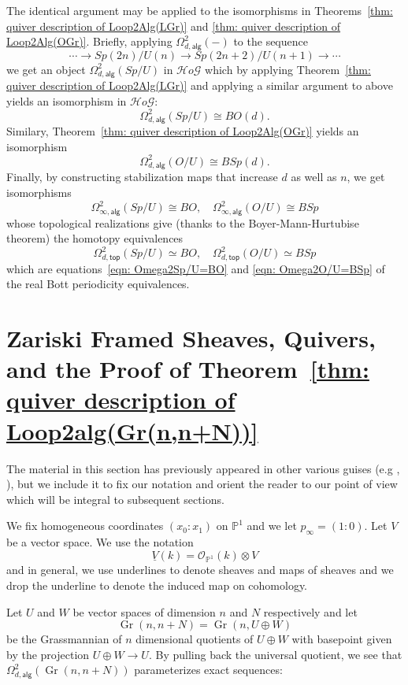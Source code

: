 \documentclass{amsart}
\theoremstyle{definition}
\newcommand{\HoG}{\mathcal{H}o\mathcal{G}}    %
\newcommand{\PP}{\mathbb{P}}
\newcommand{\OO}{\mathcal{O}}
\newcommand{\UL}[1]{\underline{#1}}
\newcommand{\alg}{\mathsf{alg}}
\renewcommand{\top}{\mathsf{top}}
\newcommand{\Gr}{\operatorname{Gr}}
\newcommand{\LoopTwo}{\Omega^{2}_{d,\alg}}
\newcommand{\LoopTwoTop}{\Omega^{2}_{d,\top}}
\newcommand{\homotopyeq}{\simeq}
\begin{document}
The identical argument may be applied to the isomorphisms in
Theorems~\ref{thm: quiver description of Loop2Alg(LGr)} and \ref{thm:
quiver description of Loop2Alg(OGr)}. Briefly, applying $\LoopTwo (-)$
to the sequence
\[
\dotsb \to Sp(2n)/U(n) \to Sp(2n+2)/U(n+1) \to \dotsb 
\]
we get an object $\LoopTwo (Sp/U)$ in $\HoG$ which by applying
Theorem~\ref{thm: quiver description of Loop2Alg(LGr)} and applying a
similar argument to above yields an isomorphism in $\HoG$:
\[
\LoopTwo (Sp/U) \cong BO(d) . 
\]
Similary, Theorem~\ref{thm: quiver description of Loop2Alg(OGr)}
yields an isomorphism
\[
\LoopTwo (O/U) \cong BSp(d) . 
\]
Finally, by constructing stabilization maps that increase $d$ as well
as $n$, we get isomorphisms
\[
\Omega^{2}_{\infty ,\alg } (Sp/U) \cong BO, \quad \Omega^{2}_{\infty ,\alg } (O/U) \cong BSp 
\]
whose topological realizations give (thanks to the
Boyer-Mann-Hurtubise theorem) the homotopy equivalences
\[
\LoopTwoTop (Sp/U)\homotopyeq BO, \quad \LoopTwoTop (O/U)\homotopyeq
BSp
\]
which are equations~\eqref{eqn: Omega2Sp/U=BO} and \eqref{eqn:
Omega2O/U=BSp} of the real Bott periodicity equivalences.


\section{Zariski Framed Sheaves, Quivers, and the Proof of
Theorem~\ref{thm: quiver description of
Loop2alg(Gr(n,n+N))}}\label{sec: Zariski framed sheaves, quivers, and
proof of Loop2(Gr) theorem}


The material in this section has previously appeared in other various
guises (e.g \cite[\S~5]{Larson-Vakil-BottPeriodicity}, \cite[\S~3]{Nakajima-Handsaw}),
but we include it to fix our notation and orient the reader to our
point of view which will be integral to subsequent sections.



We fix homogeneous coordinates $(x_{0}:x_{1})$ on $\PP^{1}$ and we let
$p_{\infty }=(1:0)$. Let $V$ be a vector space. We use the notation
\[
\UL{V}(k) = \OO_{\PP^{1}}(k)\otimes V
\]
and in general, we use underlines to denote sheaves and maps of
sheaves and we drop the underline to denote the induced map on cohomology.


Let $U$ and $W$ be vector spaces of dimension $n$ and $N$ respectively
and let
\[
\Gr (n,n+N) = \Gr (n,U\oplus W)
\]
be the Grassmannian of $n$ dimensional quotients of $U\oplus W$ with
basepoint given by the projection $U\oplus W\to U$. By pulling back
the universal quotient, we see that $\LoopTwo (\Gr (n,n+N))$
parameterizes exact sequences:
\end{document}
